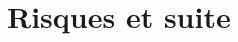 %
\section{Risques et suite}

\newcommand{\rlig}[4]{%
  \node[num] at (0.2,#1) {#2};
  \node[anchor=west,text width=6.9cm,align=left,inner sep=1pt] at (0.5,#1) {{\footnotesize\bfseries #3}\\[-2pt]{\scriptsize #4}};}


